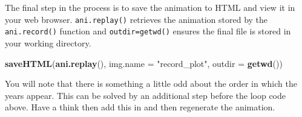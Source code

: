 \documentclass[]{article}
\newenvironment{Shaded}{}{}
\newcommand{\KeywordTok}[1]{\textcolor[rgb]{0.00,0.44,0.13}{\textbf{{#1}}}}
\newcommand{\DataTypeTok}[1]{\textcolor[rgb]{0.56,0.13,0.00}{{#1}}}
\newcommand{\DecValTok}[1]{\textcolor[rgb]{0.25,0.63,0.44}{{#1}}}
\newcommand{\FloatTok}[1]{\textcolor[rgb]{0.25,0.63,0.44}{{#1}}}
\newcommand{\StringTok}[1]{\textcolor[rgb]{0.25,0.44,0.63}{{#1}}}
\newcommand{\NormalTok}[1]{{#1}}
\begin{document}
\begin{Shaded}
\end{Shaded}
The final step in the process is to save the animation to HTML and view
it in your web browser. \texttt{ani.replay()} retrieves the animation
stored by the \texttt{ani.record()} function and \texttt{outdir=getwd()}
ensures the final file is stored in your working directory.

\begin{Shaded}
\begin{Highlighting}[]
\KeywordTok{saveHTML}\NormalTok{(}\KeywordTok{ani.replay}\NormalTok{(), }\DataTypeTok{img.name =} \StringTok{"record_plot"}\NormalTok{, }\DataTypeTok{outdir =} \KeywordTok{getwd}\NormalTok{())}
\end{Highlighting}
\end{Shaded}
You will note that there is something a little odd about the order in
which the years appear. This can be solved by an additional step before
the loop code above. Have a think then add this in and then regenerate
the animation.
\end{document}
